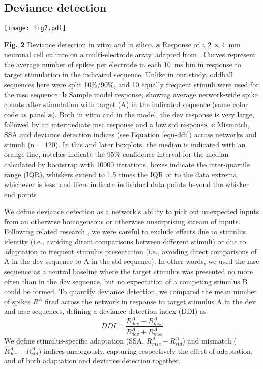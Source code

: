 \documentclass[pdflatex,referee,iicol,sn-basic]{sn-jnl}
\theoremstyle{thmstyleone}%
\theoremstyle{thmstyletwo}%
\theoremstyle{thmstylethree}%
\begin{document}
\subsection{Deviance detection}\label{sec-dd}

\begin{figure*}%
    \centering
    \texttt{[image: fig2.pdf]}
    \caption{}
    \label{fig2}
\end{figure*}
\textbf{Fig. 2} Deviance detection in vitro and in silico. \textbf{a} Response of a 2 $\times$ 4~mm neuronal cell culture on a multi-electrode array, adapted from \cite{Kubota2021-dx}. Curves represent the average number of spikes per electrode in each 10~ms bin in response to target stimulation in the indicated sequence. Unlike in our study, oddball sequences here were split 10\%/90\%, and 10 equally frequent stimuli were used for the msc sequence. \textbf{b} Sample model response, showing average network-wide spike counts after stimulation with target (A) in the indicated sequence (same color code as panel \textbf{a}). Both in vitro and in the model, the dev response is very large, followed by an intermediate msc response and a low std response. \textbf{c} Mismatch, SSA and deviance detection indices (see Equation \ref{eqn-ddi}) across networks and stimuli (n = 120). In this and later boxplots, the median is indicated with an orange line, notches indicate the 95\% confidence interval for the median calculated by bootstrap with 10000 iterations, boxes indicate the inter-quartile range (IQR), whiskers extend to 1.5 times the IQR or to the data extrema, whichever is less, and fliers indicate individual data points beyond the whisker end points

We define deviance detection as a network's ability to pick out unexpected inputs from an otherwise homogeneous or otherwise unsurprising stream of inputs. Following related research \citep{Kubota2021-dx,Harms2014-ah,Jacobsen2001-sc}, we were careful to exclude effects due to stimulus identity (i.e., avoiding direct comparisons between different stimuli) or due to adaptation to frequent stimulus presentation (i.e., avoiding direct comparisons of A in the dev sequence to A in the std sequence). In other words, we used the msc sequence as a neutral baseline where the target stimulus was presented no more often than in the dev sequence, but no expectation of a competing stimulus B could be formed. To quantify deviance detection, we compared the mean number of spikes $R^A$ fired across the network in response to target stimulus A in the dev and msc sequences, defining a deviance detection index (DDI) as
\begin{equation}
    DDI = \frac{R^A_{dev} - R^A_{msc}}{R^A_{dev} + R^A_{msc}} \label{eqn-ddi}
\end{equation}
We define stimulus-specific adaptation (SSA, $R^A_{msc} - R^A_{std}$) and mismatch ($R^A_{dev} - R^A_{std}$) indices analogously, capturing respectively the effect of adaptation, and of both adaptation and deviance detection together.
\end{document}
